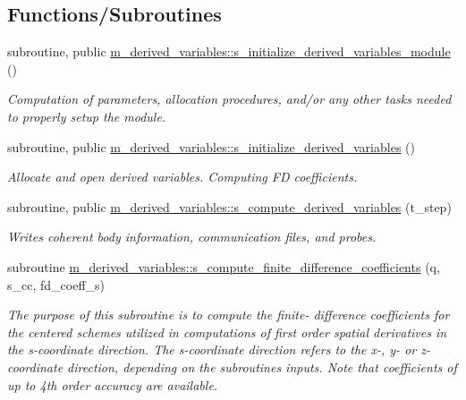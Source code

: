 \subsection*{Functions/\+Subroutines}
\begin{DoxyCompactItemize}
\item 
subroutine, public \hyperlink{namespacem__derived__variables_a15a6d70e2bd1c9b7001c753ca1f2ee27}{m\+\_\+derived\+\_\+variables\+::s\+\_\+initialize\+\_\+derived\+\_\+variables\+\_\+module} ()
\begin{DoxyCompactList}\small\item\em Computation of parameters, allocation procedures, and/or any other tasks needed to properly setup the module. \end{DoxyCompactList}\item 
subroutine, public \hyperlink{namespacem__derived__variables_ae9dbea9bb47e84dbd380c480ad5144b8}{m\+\_\+derived\+\_\+variables\+::s\+\_\+initialize\+\_\+derived\+\_\+variables} ()
\begin{DoxyCompactList}\small\item\em Allocate and open derived variables. Computing FD coefficients. \end{DoxyCompactList}\item 
subroutine, public \hyperlink{namespacem__derived__variables_a516a9808b3446b7b45029f6451d02b3f}{m\+\_\+derived\+\_\+variables\+::s\+\_\+compute\+\_\+derived\+\_\+variables} (t\+\_\+step)
\begin{DoxyCompactList}\small\item\em Writes coherent body information, communication files, and probes. \end{DoxyCompactList}\item 
subroutine \hyperlink{namespacem__derived__variables_a908281ae7fe786ef19397e268ede0ece}{m\+\_\+derived\+\_\+variables\+::s\+\_\+compute\+\_\+finite\+\_\+difference\+\_\+coefficients} (q, s\+\_\+cc, fd\+\_\+coeff\+\_\+s)
\begin{DoxyCompactList}\small\item\em The purpose of this subroutine is to compute the finite-\/ difference coefficients for the centered schemes utilized in computations of first order spatial derivatives in the s-\/coordinate direction. The s-\/coordinate direction refers to the x-\/, y-\/ or z-\/coordinate direction, depending on the subroutine\textquotesingle{}s inputs. Note that coefficients of up to 4th order accuracy are available. \end{DoxyCompactList}\item 

\end{DoxyCompactItemize}
